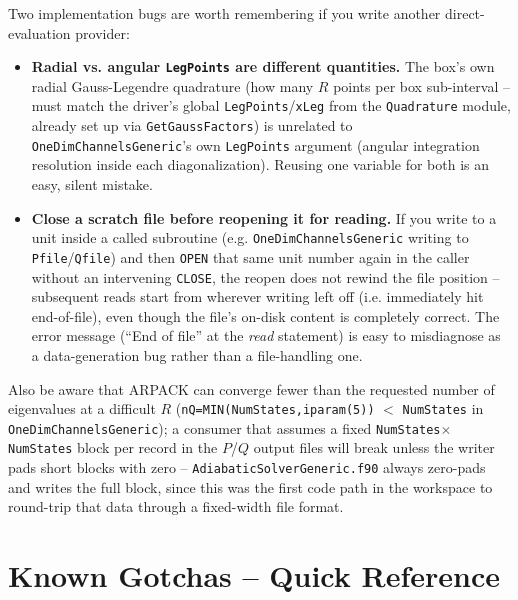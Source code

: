 \documentclass[11pt]{article}
\newcommand{\file}[1]{\texttt{#1}}
\newcommand{\sub}[1]{\texttt{#1}}
\begin{document}
Two implementation bugs are worth remembering if you write another
direct-evaluation provider:
\begin{itemize}
\item \textbf{Radial vs. angular \texttt{LegPoints} are different quantities.} The box's own radial
  Gauss-Legendre quadrature (how many $R$ points per box sub-interval -- must match the driver's
  global \texttt{LegPoints}/\texttt{xLeg} from the \texttt{Quadrature} module, already set up via
  \sub{GetGaussFactors}) is unrelated to \sub{OneDimChannelsGeneric}'s own \texttt{LegPoints}
  argument (angular integration resolution inside each diagonalization). Reusing one variable for
  both is an easy, silent mistake.
\item \textbf{Close a scratch file before reopening it for reading.} If you write to a unit inside
  a called subroutine (e.g. \sub{OneDimChannelsGeneric} writing to \texttt{Pfile}/\texttt{Qfile})
  and then \texttt{OPEN} that same unit number again in the caller without an intervening
  \texttt{CLOSE}, the reopen does not rewind the file position -- subsequent reads start from
  wherever writing left off (i.e. immediately hit end-of-file), even though the file's on-disk
  content is completely correct. The error message (``End of file'' at the \emph{read} statement)
  is easy to misdiagnose as a data-generation bug rather than a file-handling one.
\end{itemize}
Also be aware that ARPACK can converge fewer than the requested number of eigenvalues at a
difficult $R$ (\texttt{nQ=MIN(NumStates,iparam(5))} $<$ \texttt{NumStates} in
\sub{OneDimChannelsGeneric}); a consumer that assumes a fixed \texttt{NumStates}$\times$
\texttt{NumStates} block per record in the $P$/$Q$ output files will break unless the writer pads
short blocks with zero -- \file{AdiabaticSolverGeneric.f90} always zero-pads and writes the full
block, since this was the first code path in the workspace to round-trip that data through a
fixed-width file format.

\section{Known Gotchas -- Quick Reference}
\label{sec:gotchas}
\end{document}
